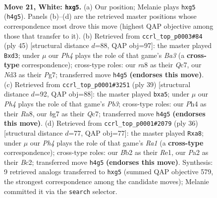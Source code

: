\documentclass[11pt]{article}
\begin{document}
\clearpage

\begin{figure}[p]\centering
\begin{subfigure}{0.46\textwidth}\centering
\resizebox{\linewidth}{!}{%
\newchessgame
\chessboard[
  setfen={r3qrk1/6bn/1pn5/p1p1Pppp/2P3bP/1PNN4/PBQP2B1/1R3RK1 w - - 0 21},
  showmover=false,
  pgfstyle=straightmove, color=movearrow, markmove={h4-g5}
]}
\caption{}
\end{subfigure}\hfill
\begin{subfigure}{0.46\textwidth}\centering
\resizebox{\linewidth}{!}{%
\newchessgame
\chessboard[
  setfen={r3rbk1/2qn1pp1/b1pp1n1p/8/1p1PPB2/1P1B1NNP/2Q2PP1/2R1R1K1 b - - 1 23},
  showmover=false,
  pgfstyle=straightmove, color=movearrow, markmove={a6-d3}
]}
\caption{}
\end{subfigure}
\\[4pt]
\begin{subfigure}{0.46\textwidth}\centering
\resizebox{\linewidth}{!}{%
\newchessgame
\chessboard[
  setfen={r4rk1/1bq3bp/1p1pp1p1/P3nn2/2P1N3/7P/P2B1PPN/2RQRBK1 b - - 0 20},
  showmover=false,
  pgfstyle=straightmove, color=movearrow, markmove={b6-a5}
]}
\caption{}
\end{subfigure}\hfill
\begin{subfigure}{0.46\textwidth}\centering
\resizebox{\linewidth}{!}{%
\newchessgame
\chessboard[
  setfen={rq1nrbk1/2p2pp1/2b2n1p/1p2p3/1P2P3/1NP1BN1P/2B1QPP1/R3R1K1 w - - 2 19},
  showmover=false,
  pgfstyle=straightmove, color=movearrow, markmove={a1-a8}
]}
\caption{}
\end{subfigure}
\caption{\textbf{Move 21, White: \texttt{hxg5}.} (a) Our position; Melanie plays \texttt{hxg5} (\texttt{h4g5}). Panels (b)--(d) are the retrieved master positions whose correspondence most drove this move (highest QAP objective among those that transfer to it). (b) Retrieved from \texttt{ccrl\_top\_p0003\#84} (ply 45) [structural distance $d$=88, QAP obj=97]: the master played \texttt{Bxd3}; under $\mu$ our \emph{Ph4} plays the role of that game's \emph{Ba3} (a \textbf{cross-type} correspondence); cross-type roles: our \emph{r}a8 as their \emph{Q}c7, our \emph{N}d3 as their \emph{P}g7; transferred move \texttt{h4g5} \textbf{(endorses this move)}. (c) Retrieved from \texttt{ccrl\_top\_p0001\#3251} (ply 39) [structural distance $d$=92, QAP obj=88]: the master played \texttt{bxa5}; under $\mu$ our \emph{Ph4} plays the role of that game's \emph{Pb3}; cross-type roles: our \emph{P}h4 as their \emph{R}a8, our \emph{b}g7 as their \emph{Q}c7; transferred move \texttt{h4g5} \textbf{(endorses this move)}. (d) Retrieved from \texttt{ccrl\_top\_p0001\#2079} (ply 36) [structural distance $d$=77, QAP obj=77]: the master played \texttt{Rxa8}; under $\mu$ our \emph{Ph4} plays the role of that game's \emph{Ra1} (a \textbf{cross-type} correspondence); cross-type roles: our \emph{B}b2 as their \emph{R}e1, our \emph{P}a2 as their \emph{B}c2; transferred move \texttt{h4g5} \textbf{(endorses this move)}. Synthesis: 9 retrieved analogs transferred to \texttt{hxg5} (summed QAP objective 579, the strongest correspondence among the candidate moves); Melanie committed it via the \texttt{search} selector.}
\label{fig:thought-m40}
\end{figure}
\end{document}
